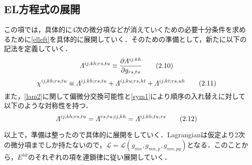 \documentclass[main]{subfiles}
\begin{document}
\subsection{EL方程式の展開}
この項では，具体的に4次の微分項などが消えていくための必要十分条件を求めるために\eqref{elleft}を具体的に展開していく．そのための準備として，新たに以下の記法を定義していく．
\begin{equation*}
    \varLambda^{ij,kh;rs,tu} \equiv \dfrac{\partial \varLambda^{ij,kh}}{\partial g_{rs,tu} }
    \tag{2.10} \label{lam2}
\end{equation*}
\begin{equation*}
    \chi^{ij,kh;rs,tu} \equiv \varLambda^{ij,kh;rs,tu} + \varLambda^{ij,ku;rs,ht} + \varLambda^{ij,kt;rs,uh}
    \tag{2.11} \label{chi}
\end{equation*}
また，\eqref{lam2}に関して偏微分交換可能性と\eqref{sym1}により順序の入れ替えに対して以下のような対称性を持つ．
\begin{equation*}
    \varLambda^{ij,kh;rs,tu} = \varLambda^{rs,tu;ij,kh} = \varLambda^{ij,kh;tu,rs}
    \tag{2.12} \label{sym2}
\end{equation*}

以上で，準備は整ったので具体的に展開をしていく．Lagrangianは仮定より2次の微分項までしか持たないので，\(\mathscr{L} = \mathscr{L}(g_{mn}, g_{mn,p}, g_{mn,pq})\)となる．このことから，\(E^{hk}\)のそれぞれの項を連鎖律に従い展開していく．
\end{document}
